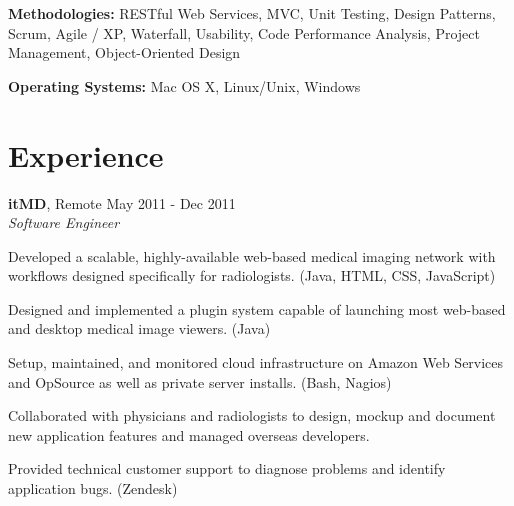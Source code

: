 \documentclass[margin,line]{resume}
\begin{document}
\begin{resume}
  \textbf{Methodologies:} RESTful Web Services, MVC, Unit Testing,
  Design Patterns, Scrum, Agile / XP, Waterfall, Usability, Code
  Performance Analysis, Project Management, Object-Oriented Design
	\vspace{-2mm}

  \textbf{Operating Systems:} Mac OS X, Linux/Unix, Windows



  \section{\mysidestyle \textcolor{mySideColor}{Experience}}

  \textbf{itMD}, Remote \hfill May 2011 - Dec 2011\vspace{1mm}\\
  \textsl{Software Engineer}\\
  \vspace{-3mm}
  \begin{list2}
  \item Developed a scalable, highly-available web-based medical
    imaging network with workflows designed specifically for
    radiologists. (Java, HTML, CSS, JavaScript)
  \item Designed and implemented a plugin system capable of launching
    most web-based and desktop medical image viewers. (Java)
  \item Setup, maintained, and monitored cloud infrastructure on
    Amazon Web Services and OpSource as well as private server
    installs. (Bash, Nagios)
  \item Collaborated with physicians and radiologists to design,
    mockup and document new application features and managed overseas
    developers.
  \item Provided technical customer support to diagnose problems and
    identify application bugs. (Zendesk)
  \end{list2}


\end{resume}
\end{document}

